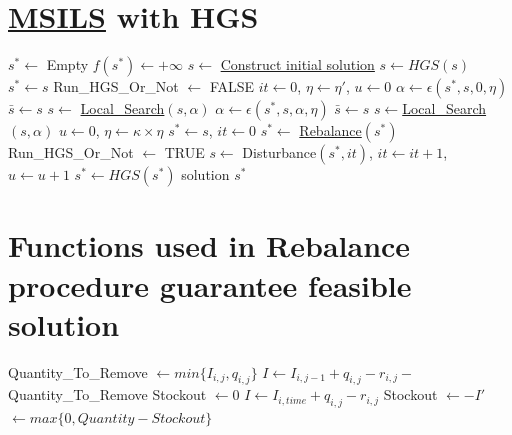 \documentclass{article}
\begin{document}
\section{\hyperref[alg:MSILS]{MSILS} with HGS}\label{MSILS with HGS}


\begin{algorithm}[H]
\caption{\textbf{\hyperref[alg:MSILS]{MSILS} with HGS in \cite{vidal2022hybrid}}}\label{alg:MSILS with HGS}
\begin{algorithmic}[1]
\STATE $s^* \gets$ Empty \AND  $f(s^*) \gets +\infty$  
\STATE $s\gets$ \hyperref[alg:InitialSchedule]{Construct initial solution} 
\STATE $s \gets HGS(s)$ 
 \STATE $s^*\gets s$ \ENDIF
\STATE Run\_HGS\_Or\_Not $\gets$ FALSE
\STATE  $it \gets 0$, $\eta \gets \eta'$, $u\gets 0$ 
    \STATE $\alpha \gets \epsilon (s^*, s , 0, \eta)$  
    \STATE $\bar{s} \gets s$
    \STATE $s\gets$ \hyperref[alg:LocalSearch]{Local\_Search}$(s,\alpha)$    
        \STATE  $\alpha \gets \epsilon (s^*, s , \alpha, \eta)$       
        \STATE $\bar{s} \gets s$
        \STATE $s\gets$\hyperref[alg:LocalSearch]{Local\_Search}$(s,\alpha)$       
    \ENDWHILE
        \STATE $u\gets 0$, $\eta \gets \kappa \times \eta$ 
    \ENDIF
        \STATE $s^*\gets s$, $it\gets 0$
        \STATE $s^*\gets$ \hyperref[alg:rebalance]{Rebalance}$(s^*)$            
        \STATE Run\_HGS\_Or\_Not $\gets$ TRUE
    \ENDIF
    \STATE $s \gets$ Disturbance$(s^*, it)$, $it\gets it+1$, $u\gets u+1$ 
\ENDWHILE 
{}
    \STATE $s^* \gets HGS(s^*)$
\ENDIF
\ENDFOR
\RETURN solution $s^*$
\end{algorithmic}
\end{algorithm}

\section{Functions used in Rebalance procedure guarantee feasible solution}



\begin{algorithm}[H]
\caption{\textbf{Feasible\_Quantity\_To\_Removal$(i,j)$}} \label{alg:FeasibleQuantityRemoval}
\begin{algorithmic}[1]
\STATE Quantity\_To\_Remove $\gets min\{I_{i,j}, q_{i,j}\}$ 
\STATE $I\gets I_{i,j-1}+ q_{i,j} -r_{i,j} - $Quantity\_To\_Remove 
\STATE Stockout $\gets 0$
\STATE $I\gets I_{i,time}+ q_{i,j} -r_{i,j}$
    \STATE Stockout $\gets -I'$
\ENDIF
\ENDFOR
\RETURN $\gets max\{0, Quantity - Stockout\}$
\end{algorithmic}
\end{algorithm}
\end{document}
